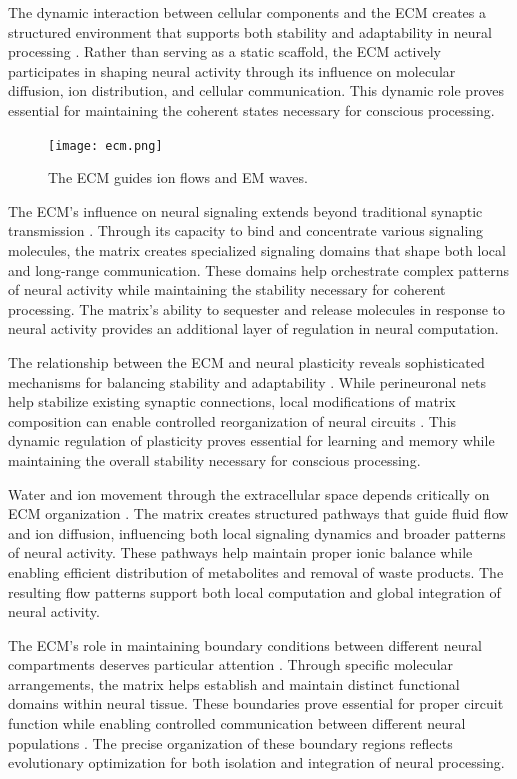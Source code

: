 \begin{refsection}
The dynamic interaction between cellular components and the ECM creates a structured environment that supports both stability and adaptability in neural processing \cite{Dityatev2003}. Rather than serving as a static scaffold, the ECM actively participates in shaping neural activity through its influence on molecular diffusion, ion distribution, and cellular communication. This dynamic role proves essential for maintaining the coherent states necessary for conscious processing.

\begin{figure}[h]
    \centering
    \texttt{[image: ecm.png]}

    \caption{The ECM guides ion flows and EM waves.}
\end{figure}

The ECM's influence on neural signaling extends beyond traditional synaptic transmission \cite{Vargova2014}. Through its capacity to bind and concentrate various signaling molecules, the matrix creates specialized signaling domains that shape both local and long-range communication. These domains help orchestrate complex patterns of neural activity while maintaining the stability necessary for coherent processing. The matrix's ability to sequester and release molecules in response to neural activity provides an additional layer of regulation in neural computation.

The relationship between the ECM and neural plasticity reveals sophisticated mechanisms for balancing stability and adaptability \cite{Dityatev2010}. While perineuronal nets help stabilize existing synaptic connections, local modifications of matrix composition can enable controlled reorganization of neural circuits \cite{Burnside2014}. This dynamic regulation of plasticity proves essential for learning and memory while maintaining the overall stability necessary for conscious processing.

Water and ion movement through the extracellular space depends critically on ECM organization \cite{Hrabetova2009}. The matrix creates structured pathways that guide fluid flow and ion diffusion, influencing both local signaling dynamics and broader patterns of neural activity. These pathways help maintain proper ionic balance while enabling efficient distribution of metabolites and removal of waste products. The resulting flow patterns support both local computation and global integration of neural activity.

The ECM's role in maintaining boundary conditions between different neural compartments deserves particular attention \cite{Barros2011}. Through specific molecular arrangements, the matrix helps establish and maintain distinct functional domains within neural tissue. These boundaries prove essential for proper circuit function while enabling controlled communication between different neural populations \cite{Frischknecht2012}. The precise organization of these boundary regions reflects evolutionary optimization for both isolation and integration of neural processing.


\end{refsection}
